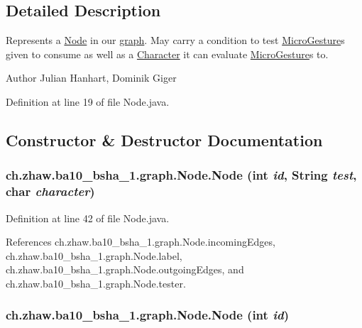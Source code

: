 \subsection{Detailed Description}
Represents a \hyperlink{classch_1_1zhaw_1_1ba10__bsha__1_1_1graph_1_1Node}{Node} in our \hyperlink{namespacech_1_1zhaw_1_1ba10__bsha__1_1_1graph}{graph}. May carry a condition to test \hyperlink{}{MicroGesture}s given to consume as well as a \hyperlink{classch_1_1zhaw_1_1ba10__bsha__1_1_1Character}{Character} it can evaluate \hyperlink{}{MicroGesture}s to.

\begin{DoxyAuthor}{Author}
Julian Hanhart, Dominik Giger 
\end{DoxyAuthor}


Definition at line 19 of file Node.java.

\subsection{Constructor \& Destructor Documentation}
\hypertarget{classch_1_1zhaw_1_1ba10__bsha__1_1_1graph_1_1Node_ac83645efc3aceb760b465c38bd3d6083}{
\subsubsection[{Node}]{\setlength{\rightskip}{0pt plus 5cm}ch.zhaw.ba10\_\-bsha\_\-1.graph.Node.Node (int {\em id}, \/  String {\em test}, \/  char {\em character})}}
\label{classch_1_1zhaw_1_1ba10__bsha__1_1_1graph_1_1Node_ac83645efc3aceb760b465c38bd3d6083}


Definition at line 42 of file Node.java.

References ch.zhaw.ba10\_\-bsha\_\-1.graph.Node.incomingEdges, ch.zhaw.ba10\_\-bsha\_\-1.graph.Node.label, ch.zhaw.ba10\_\-bsha\_\-1.graph.Node.outgoingEdges, and ch.zhaw.ba10\_\-bsha\_\-1.graph.Node.tester.\hypertarget{classch_1_1zhaw_1_1ba10__bsha__1_1_1graph_1_1Node_afbca65b1cddca6b543f2227031529020}{
\subsubsection[{Node}]{\setlength{\rightskip}{0pt plus 5cm}ch.zhaw.ba10\_\-bsha\_\-1.graph.Node.Node (int {\em id})}}
\label{classch_1_1zhaw_1_1ba10__bsha__1_1_1graph_1_1Node_afbca65b1cddca6b543f2227031529020}



